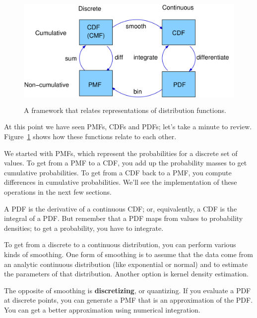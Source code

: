\documentclass[12pt]{book}
\begin{document}
\begin{figure}
\centerline{\includegraphics[height=2.2in]{figs/distribution_functions.pdf}}
\caption{A framework that relates representations of distribution
functions.}
\label{dist_framework}
\end{figure}

At this point we have seen PMFs, CDFs and PDFs; let's take a minute
to review.  Figure~\ref{dist_framework} shows how these functions relate
to each other.

We started with PMFs, which represent the probabilities for a discrete
set of values.  To get from a PMF to a CDF, you add up the probability
masses to get cumulative probabilities.  
To get from a CDF back to a PMF, you compute differences in cumulative
probabilities.  We'll see the implementation of these operations
in the next few sections.

A PDF is the derivative of a continuous CDF; or, equivalently,
a CDF is the integral of a PDF.  But remember that a PDF maps from
values to probability densities; to get a probability, you have to
integrate.

To get from a discrete to a continuous distribution, you can perform
various kinds of smoothing.  One form of smoothing is to assume that
the data come from an analytic continuous distribution
(like exponential or normal) and to estimate the parameters of that
distribution.  Another option is kernel density estimation.

The opposite of smoothing is {\bf discretizing}, or quantizing.  If you
evaluate a PDF at discrete points, you can generate a PMF that is an
approximation of the PDF.  You can get a better approximation using
numerical integration.  
\end{document}
